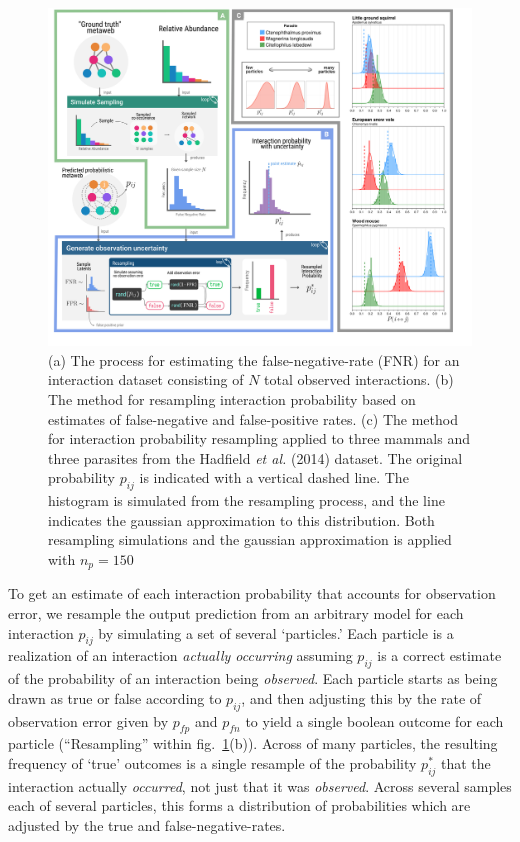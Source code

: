 \documentclass[10pt,oneside]{article}
\makeatletter
\def\maxwidth{\ifdim\Gin@nat@width>\linewidth\linewidth
\else\Gin@nat@width\fi}
\let\Oldincludegraphics\includegraphics
\renewcommand{\includegraphics}[1]{\Oldincludegraphics[width=\maxwidth]{#1}}
\makeatother
\begin{document}
\begin{figure}
\hypertarget{fig:resampling_concept}{%
\centering
\includegraphics{./figures/uncertainty_sampler.png}
\caption{(a) The process for estimating the false-negative-rate (FNR)
for an interaction dataset consisting of \(N\) total observed
interactions. (b) The method for resampling interaction probability
based on estimates of false-negative and false-positive rates. (c) The
method for interaction probability resampling applied to three mammals
and three parasites from the Hadfield \emph{et al.} (2014) dataset. The
original probability \(p_{ij}\) is indicated with a vertical dashed
line. The histogram is simulated from the resampling process, and the
line indicates the gaussian approximation to this distribution. Both
resampling simulations and the gaussian approximation is applied with
\(n_p =150\)}\label{fig:resampling_concept}
}
\end{figure}

To get an estimate of each interaction probability that accounts for
observation error, we resample the output prediction from an arbitrary
model for each interaction \(p_{ij}\) by simulating a set of several
`particles.' Each particle is a realization of an interaction
\emph{actually occurring} assuming \(p_{ij}\) is a correct estimate of
the probability of an interaction being \emph{observed}. Each particle
starts as being drawn as true or false according to \(p_{ij}\), and then
adjusting this by the rate of observation error given by \(p_{fp}\) and
\(p_{fn}\) to yield a single boolean outcome for each particle
(``Resampling'' within fig.~\ref{fig:resampling_concept}(b)). Across of
many particles, the resulting frequency of `true' outcomes is a single
resample of the probability \(p_{ij}^*\) that the interaction actually
\emph{occurred}, not just that it was \emph{observed}. Across several
samples each of several particles, this forms a distribution of
probabilities which are adjusted by the true and false-negative-rates.
\end{document}
